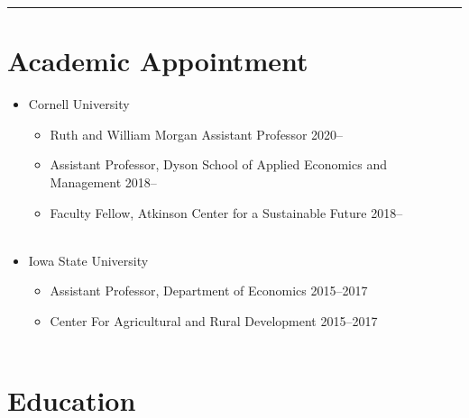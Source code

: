 \documentclass{res} %
\begin{document}
\begin{resume}
\vspace{-0.08in}
\hrule
\vspace{-0.1in}

\section{Academic Appointment}


	\begin{itemize} \itemsep -12pt
	\item[] Cornell University
		\vspace{-0.05in}
		\begin{itemize} \itemsep -1pt
			\item[] Ruth and William Morgan Assistant Professor \hfill 2020-- 
			\item[] Assistant Professor, Dyson School of Applied Economics and Management \hfill 2018-- 
			\item[] Faculty Fellow, Atkinson Center for a Sustainable Future \hfill 2018--\\\
		\end{itemize}
		\item[] Iowa State University
		\vspace{-0.05in}
		\begin{itemize} \itemsep -1pt
			\item[] Assistant Professor, Department of Economics \hfill 2015--2017
			\item[] Center For Agricultural and Rural Development \hfill 2015--2017 \\\
		\end{itemize}
		\vspace{-0.075in}
	\end{itemize}
\vspace{-0.3in}
\section{Education}


\end{resume}
\end{document}
